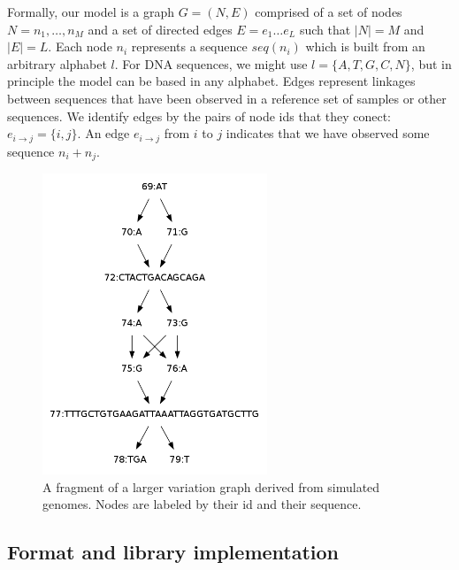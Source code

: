 \documentclass{article}
\begin{document}
Formally, our model is a graph $G = ( N, E )$ comprised of a set of nodes $N = n_1, \ldots ,n_M$ and a set of directed edges $E = e_1 \ldots e_L$ such that $|N| = M$ and $|E| = L$. Each node $n_i$ represents a sequence $seq(n_i)$ which is built from an arbitrary alphabet $l$.
For DNA sequences, we might use $l = \{ A, T, G, C, N \}$, but in principle the model can be based in any alphabet.
Edges represent linkages between sequences that have been observed in a reference set of samples or other sequences. We identify edges by the pairs of node ids that they conect: $e_{i \rightarrow j} = \{ i, j \}$.
An edge $e_{i \rightarrow j}$ from $i$ to $j$ indicates that we have observed some sequence $n_i + n_j$.

\begin{figure}[h!]
\centering
\includegraphics[width=0.6\textwidth]{figures/variationgraph}
\caption{\label{fig:variationgraph}
A fragment of a larger variation graph derived from simulated genomes. Nodes are labeled by their id and their sequence.
}
\end{figure}

\subsection{Format and library implementation}
\end{document}
